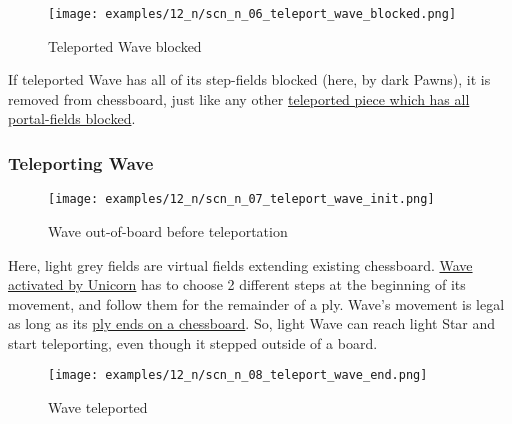 \clearpage %

\noindent
\begin{figure}[!h]
\texttt{[image: examples/12\_n/scn\_n\_06\_teleport\_wave\_blocked.png]}
\caption{Teleported Wave blocked}
\label{fig:scn_n_06_teleport_wave_blocked}
\end{figure}

If teleported Wave has all of its step-fields blocked (here, by dark Pawns), it is
removed from chessboard, just like any other
\hyperref[fig:scn_n_03_teleport_move_2]{teleported piece which has all portal-fields blocked}.

\clearpage %

\subsubsection*{Teleporting Wave}

\vspace*{-1.2\baselineskip}
\noindent
\begin{figure}[!h]
\texttt{[image: examples/12\_n/scn\_n\_07\_teleport\_wave\_init.png]}
\caption{Wave out-of-board before teleportation}
\label{fig:scn_n_07_teleport_wave_init}
\end{figure}

Here, light grey fields are virtual fields extending existing chessboard.
\hyperref[fig:scn_mv_26_wave_activation_by_unicorn]{Wave activated by Unicorn}
has to choose 2 different steps at the beginning of its movement, and follow
them for the remainder of a ply. Wave's movement is legal as long as its
\hyperref[fig:scn_mv_28_wave_off_board]{ply ends on a chessboard}. So, light
Wave can reach light Star and start teleporting, even though it stepped
outside of a board.

\clearpage %

\noindent
\begin{figure}[!h]
\texttt{[image: examples/12\_n/scn\_n\_08\_teleport\_wave\_end.png]}
\caption{Wave teleported}
\label{fig:scn_n_08_teleport_wave_end}
\end{figure}

